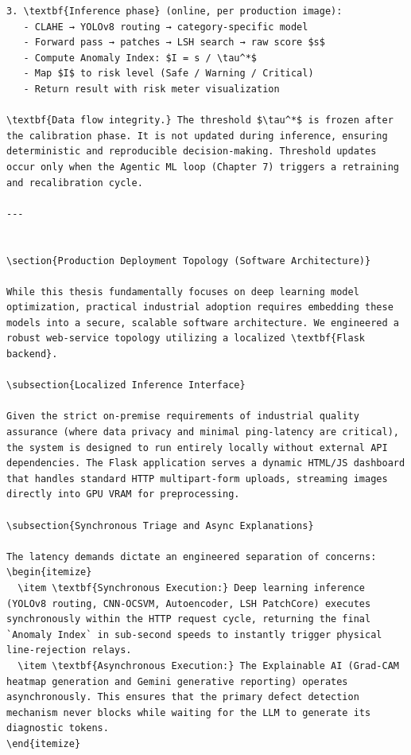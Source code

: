 \documentclass[12pt,a4paper,oneside]{report}
\begin{document}
\begin{verbatim}
3. \textbf{Inference phase} (online, per production image):
   - CLAHE → YOLOv8 routing → category-specific model
   - Forward pass → patches → LSH search → raw score $s$
   - Compute Anomaly Index: $I = s / \tau^*$
   - Map $I$ to risk level (Safe / Warning / Critical)
   - Return result with risk meter visualization

\textbf{Data flow integrity.} The threshold $\tau^*$ is frozen after the calibration phase. It is not updated during inference, ensuring deterministic and reproducible decision-making. Threshold updates occur only when the Agentic ML loop (Chapter 7) triggers a retraining and recalibration cycle.

---


\section{Production Deployment Topology (Software Architecture)}

While this thesis fundamentally focuses on deep learning model optimization, practical industrial adoption requires embedding these models into a secure, scalable software architecture. We engineered a robust web-service topology utilizing a localized \textbf{Flask backend}. 

\subsection{Localized Inference Interface}

Given the strict on-premise requirements of industrial quality assurance (where data privacy and minimal ping-latency are critical), the system is designed to run entirely locally without external API dependencies. The Flask application serves a dynamic HTML/JS dashboard that handles standard HTTP multipart-form uploads, streaming images directly into GPU VRAM for preprocessing.

\subsection{Synchronous Triage and Async Explanations}

The latency demands dictate an engineered separation of concerns:
\begin{itemize}
  \item \textbf{Synchronous Execution:} Deep learning inference (YOLOv8 routing, CNN-OCSVM, Autoencoder, LSH PatchCore) executes synchronously within the HTTP request cycle, returning the final `Anomaly Index` in sub-second speeds to instantly trigger physical line-rejection relays.
  \item \textbf{Asynchronous Execution:} The Explainable AI (Grad-CAM heatmap generation and Gemini generative reporting) operates asynchronously. This ensures that the primary defect detection mechanism never blocks while waiting for the LLM to generate its diagnostic tokens.
\end{itemize}

\end{verbatim}
\end{document}
